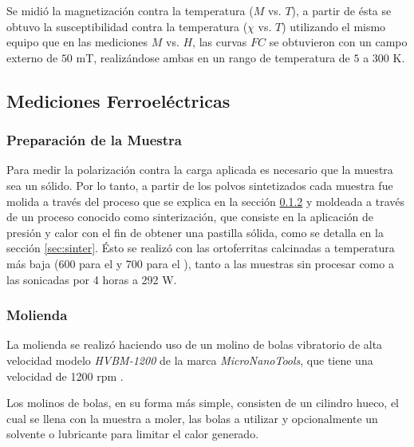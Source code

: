 \documentclass[../main.tex]{subfiles}
\begin{document}
Se midió la magnetización contra la temperatura ($M$ vs. $T$), a partir de ésta se obtuvo la susceptibilidad contra la temperatura ($\chi$ vs. $T$) utilizando el mismo equipo que en las mediciones $M$ vs. $H$, las curvas $FC$ se obtuvieron con un campo externo de $50$ mT, realizándose ambas en un rango de temperatura de $5$ a $300$ K.
\subsection{Mediciones Ferroeléctricas}

\subsubsection{Preparación de la Muestra}
Para medir la polarización contra la carga aplicada es necesario que la muestra sea un sólido. Por lo tanto, a partir de los polvos sintetizados cada muestra fue molida a través del proceso que se explica en la sección \ref{sec:molienda} y moldeada a través de un proceso conocido como sinterización, que consiste en la aplicación de presión y calor con el fin de obtener una pastilla sólida, como se detalla en la sección \ref{sec:sinter}. Ésto se realizó con las ortoferritas calcinadas a temperatura más baja (600\gradoC{} para el \neod{} y 700\gradoC{} para el \sama{}), tanto a las muestras sin procesar como a las sonicadas por 4 horas a 292 W.

\subsubsection{Molienda} \label{sec:molienda}
La molienda se realizó haciendo uso de un molino de bolas vibratorio de alta velocidad modelo \textit{HVBM-1200} de la marca \textit{MicroNanoTools}, que tiene una velocidad de 1200 rpm \cite{Molino}.

Los molinos de bolas, en su forma más simple, consisten de un cilindro hueco, el cual se llena con la muestra a moler, las bolas a utilizar y opcionalmente un solvente o lubricante para limitar el calor generado.
\end{document}
